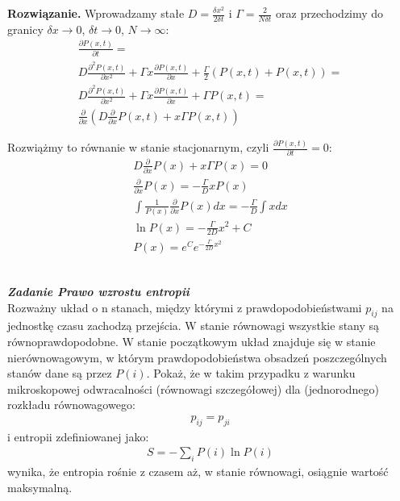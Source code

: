 \documentclass[11pt,a4paper]{article}
\newcounter{zadanie}\newcommand{\zadanie}[1][]{\addtocounter{zadanie}{1} ~\\  {\bf \emph{Zadanie \arabic{zadanie} #1 }} \\}
\newenvironment{solution}{\vspace{1cm} \par\textbf{Rozwiązanie.} \vspace{1cm}}{}
\begin{document}
\begin{solution}
Wprowadzamy stałe $D = \frac{\delta x^2}{2\delta t}$ i 
$\Gamma = \frac{2}{N\delta t}$ oraz przechodzimy do 
granicy $\delta x \to 0$, $ \delta t \to 0$, $N \to \infty$:
\begin{align*}
  \frac{\partial P(x,t)}{\partial t} = \\
  D \frac{\partial^2 P(x,t)}{\partial x^2} + 
  \Gamma x\frac{\partial P(x,t)}{\partial x} +
  \frac{\Gamma}{2} (P(x,t) + P(x,t)) = \\
  D \frac{\partial^2 P(x,t)}{\partial x^2} + 
  \Gamma x\frac{\partial P(x,t)}{\partial x} +
  \Gamma P(x,t) = \\
  \frac{\partial}{\partial x} \left(D \frac{\partial}{\partial x}P(x,t) + x\Gamma P(x,t)   \right)
\end{align*}

Rozwiążmy to równanie w stanie stacjonarnym, czyli $\frac{\partial P(x,t)}{\partial t} = 0$:
\begin{align*}
  D \frac{\partial}{\partial x}P(x) +x\Gamma P(x) = 0 \\
  \frac{\partial}{\partial x}P(x) = -\frac{\Gamma}{D} x P(x) \\
  \int \frac{1}{P(x)} \frac{\partial}{\partial x}P(x) dx = -\frac{\Gamma}{D} \int x dx \\
  \ln P(x) = -\frac{\Gamma}{2D} x^2 + C \\
  P(x) = e^C e^{-\frac{\Gamma}{2D} x^2} 
\end{align*}


\newpage
\end{solution}
\newpage
\zadanie[Prawo wzrostu entropii]

Rozważny układ o n stanach, między którymi z prawdopodobieństwami $p_{ij}$ 
na jednostkę czasu zachodzą przejścia. W stanie równowagi wszystkie stany 
są równoprawdopodobne. 
W stanie początkowym układ znajduje się w stanie nierównowagowym,
w którym prawdopodobieństwa obsadzeń poszczególnych stanów dane są przez $P(i)$.
Pokaż, że w takim przypadku z warunku mikroskopowej odwracalności 
(równowagi szczegółowej) dla (jednorodnego) rozkładu równowagowego:
\begin{align*}
  p_{ij} = p_{ji}
\end{align*}
i entropii zdefiniowanej jako:
\begin{align*}
  S = -\sum_i P(i) \ln P(i)
\end{align*}
wynika, że entropia rośnie z czasem aż, w stanie równowagi, osiągnie wartość maksymalną.
\end{document}
